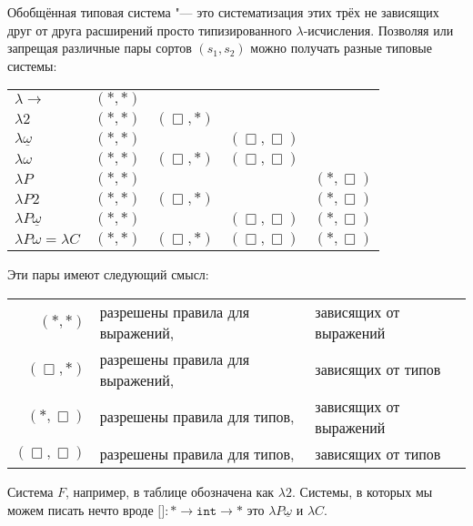 Обобщённая типовая система "--- это систематизация этих трёх не зависящих друг от друга расширений
просто типизированного $\lambda$-исчисления.
Позволяя или запрещая различные пары сортов $(s_1, s_2)$ можно получать разные типовые системы:
\begin{center}
\begin{tabular}{l c c c c} \toprule
    $\lambda{\rightarrow}$         & $(*, *)$ &             &                &             \\
    $\lambda 2$                    & $(*, *)$ & $(\Box, *)$ &                &             \\
    $\lambda \underline \omega$    & $(*, *)$ &             & $(\Box, \Box)$ &             \\
    $\lambda \omega$               & $(*, *)$ & $(\Box, *)$ & $(\Box, \Box)$ &             \\
    $\lambda P$                    & $(*, *)$ &             &                & $(*, \Box)$ \\
    $\lambda P2$                   & $(*, *)$ & $(\Box, *)$ &                & $(*, \Box)$ \\
    $\lambda P\underline \omega$   & $(*, *)$ &             & $(\Box, \Box)$ & $(*, \Box)$ \\
    $\lambda P \omega = \lambda C$ & $(*, *)$ & $(\Box, *)$ & $(\Box, \Box)$ & $(*, \Box)$ \\ \bottomrule
\end{tabular}
\end{center}%
Эти пары имеют следующий смысл:
\begin{center}
\begin{tabular}{r l@{\ }l} \toprule
    $(*, *)$       & разрешены правила для выражений, &зависящих от выражений \\
    $(\Box, *)$    & разрешены правила для выражений, &зависящих от типов     \\
    $(*, \Box)$    & разрешены правила для типов,     &зависящих от выражений \\
    $(\Box, \Box)$ & разрешены правила для типов,     &зависящих от типов     \\ \bottomrule
\end{tabular}
\end{center}

Система $F$, например, в таблице обозначена как $\lambda 2$.
Системы, в которых мы можем писать нечто вроде
$\texttt{[]}: * \rightarrow \mathtt{int} \rightarrow *$ это $\lambda P \underline \omega$ и $\lambda C$.

